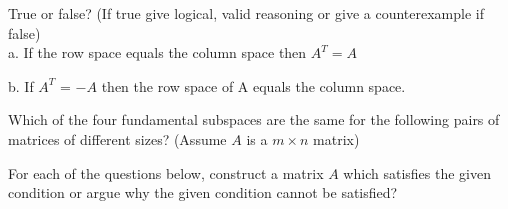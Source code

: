 \documentclass[solution,addpoints,12pt]{exam}
\begin{document}
\begin{questions}
\begin{solution}
\end{solution}
\question[1] True or false? (If true give logical, valid reasoning or give a counterexample if false)\\
a. If the row space equals the column space then $A^T = A$
\begin{solution}
\end{solution}
b. If $A^T$ = $-A$ then the row space of A equals the column space.
\begin{solution}
\end{solution}

\question[1] Which of the four fundamental subspaces are the same for the following pairs of matrices of different sizes? (Assume $A$ is a $m \times n$ matrix)\\

\question[2] For each of the questions below, construct a matrix $A$ which satisfies the given condition or argue why the given condition cannot be satisfied? 

\end{questions}
\end{document}
